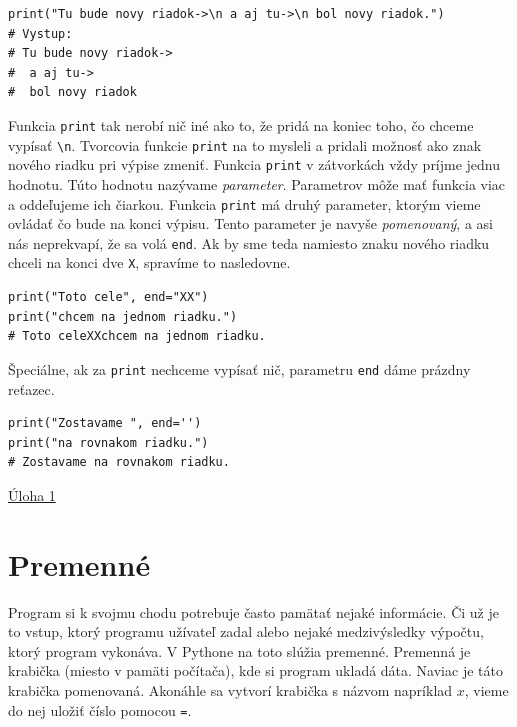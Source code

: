 \documentclass{article}
\begin{document}
\begin{lstlisting}
print("Tu bude novy riadok->\n a aj tu->\n bol novy riadok.")
# Vystup:
# Tu bude novy riadok->
#  a aj tu->
#  bol novy riadok
\end{lstlisting}


Funkcia \texttt{print} tak nerobí nič iné ako to, že pridá na koniec toho, čo chceme vypísať \texttt{\textbackslash n}. Tvorcovia funkcie \texttt{print} na to mysleli a pridali možnosť ako znak nového riadku pri výpise zmeniť. Funkcia \texttt{print} v zátvorkách vždy príjme jednu hodnotu. Túto hodnotu nazývame \textit{parameter}. Parametrov môže mať funkcia viac a oddeľujeme ich čiarkou. Funkcia \texttt{print} má druhý parameter, ktorým vieme ovládať čo bude na konci výpisu. Tento parameter je navyše \textit{pomenovaný}, a asi nás neprekvapí, že sa volá \texttt{end}. Ak by sme teda namiesto znaku nového riadku chceli na konci dve \texttt{X}, spravíme to nasledovne.

\begin{lstlisting}
print("Toto cele", end="XX")
print("chcem na jednom riadku.")
# Toto celeXXchcem na jednom riadku.
\end{lstlisting}

Špeciálne, ak za \texttt{print} nechceme vypísať nič, parametru \texttt{end} dáme prázdny reťazec.
\begin{lstlisting}
print("Zostavame ", end='')
print("na rovnakom riadku.")
# Zostavame na rovnakom riadku.
\end{lstlisting}

\href{https://testovac.ksp.sk/tasks/ls-uvod-ahoj/}{Úloha 1}

\section{Premenné}

Program si k svojmu chodu potrebuje často pamätať nejaké informácie. Či už je to vstup, ktorý programu užívateľ zadal alebo nejaké medzivýsledky výpočtu, ktorý program vykonáva. V Pythone na toto slúžia premenné. Premenná je krabička (miesto v pamäti počítača), kde si program ukladá dáta. Naviac je táto krabička pomenovaná. Akonáhle sa vytvorí krabička s názvom napríklad $x$, vieme do nej uložiť číslo pomocou \texttt{=}.
\end{document}
